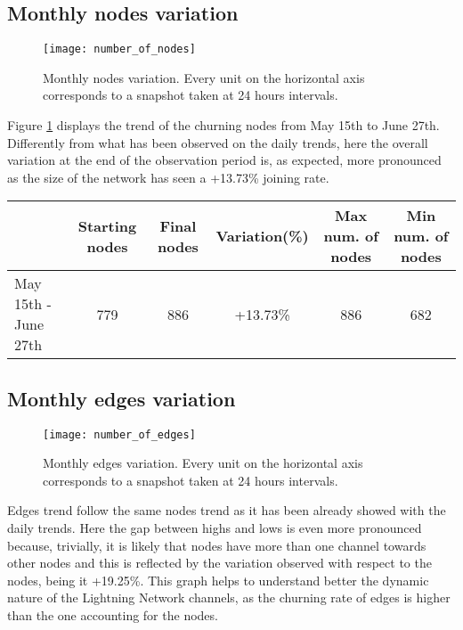 	\subsection{Monthly nodes variation}
	
	\begin{figure}
		\centering
		\texttt{[image: number\_of\_nodes]}
		\caption{Monthly nodes variation. Every unit on the horizontal axis corresponds to a snapshot taken at 24 hours intervals.}
		\label{monthly_nodes}
	\end{figure}
	
	Figure \ref{monthly_nodes} displays the trend of the churning nodes from May 15th to June 27th. Differently from what has been observed on the daily trends, here the overall variation at the end of the observation period is, as expected, more pronounced as the size of the network has seen a +13.73\% joining rate.
	
	\begin{center}
		\begin{tabulary}{\linewidth}{| L | C | C | C | C | C |}
			\hline	
			& Starting nodes & Final nodes  & Variation(\%) & Max num. of nodes & Min num. of nodes \\ \hline
			May 15th - June 27th & 779 & 886 & +13.73\% & 886 & 682 \\ \hline
		\end{tabulary}
	\end{center}
	
	\subsection{Monthly edges variation}
	\begin{figure}
		\centering
		\texttt{[image: number\_of\_edges]}
		\caption{Monthly edges variation. Every unit on the horizontal axis corresponds to a snapshot taken at 24 hours intervals.}
		\label{monthly_edges}
	\end{figure}

	Edges trend follow the same nodes trend as it has been already showed with the daily trends. Here the gap between highs and lows is even more pronounced because, trivially, it is likely that nodes have more than one channel towards other nodes and this is reflected by the variation observed with respect to the nodes, being it +19.25\%. This graph helps to understand better the dynamic nature of the Lightning Network channels, as the churning rate of edges is higher than the one accounting for the nodes. 
	
